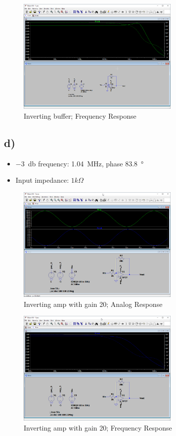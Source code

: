 \documentclass{article}
\begin{document}
	\begin{figure}[H]
	    \centering
	    \includegraphics[width=0.7\textwidth]{1c-2}
	    \caption{Inverting buffer; Frequency Response}
	\end{figure}
	
	\subsection*{d)}
	
	\begin{itemize}
		\item \SI{-3}{\decibel} frequency: \SI{1.04}{\mega\hertz}, phase \SI{83.8}{\degree}
		\item Input impedance: $1k \Omega$
	\end{itemize}
	
	\begin{figure}[H]
	    \centering
	    \includegraphics[width=0.7\textwidth]{1d-1}
	    \caption{Inverting amp with gain 20; Analog Response}
	\end{figure}

	\begin{figure}[H]
	    \centering
	    \includegraphics[width=0.7\textwidth]{1d-2}
	    \caption{Inverting amp with gain 20; Frequency Response}
	\end{figure}
	
\end{document}
